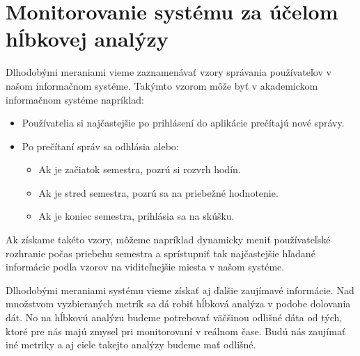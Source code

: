 \documentclass[a4paper, upjsfrontpage, disablespecwarning, thesismargins, thesislinespacing]{rnthesis}
\begin{document}

\section{Monitorovanie systému za účelom hĺbkovej analýzy}

Dlhodobými meraniami vieme zaznamenávať vzory správania používateľov v našom informačnom systéme.
Takýmto vzorom môže byť v akademickom informačnom systéme napríklad:

\begin{itemize}
	\item Používatelia si najčastejšie po prihlásení do aplikácie prečítajú nové správy.
	\item Po prečítaní správ sa odhlásia alebo:
	\begin{itemize}
		\item Ak je začiatok semestra, pozrú si rozvrh hodín.
		\item Ak je stred semestra, pozrú sa na priebežné hodnotenie.
		\item Ak je koniec semestra, prihlásia sa na skúšku.
	\end{itemize}
\end{itemize}

Ak získame takéto vzory, môžeme napríklad dynamicky meniť používateľské rozhranie počas priebehu semestra a sprístupniť tak najčastejšie hľadané informácie podľa vzorov na viditeľnejšie miesta v našom systéme.

Dlhodobými meraniami systému vieme získať aj ďalšie zaujímavé informácie.
Nad množstvom vyzbieraných metrík sa dá robiť hĺbková analýza v podobe dolovania dát.
No na hĺbkovú analýzu budeme potrebovať väčšinou odlišné dáta od tých, ktoré pre nás majú zmysel pri monitorovaní v reálnom čase.
Budú nás zaujímať iné metriky a aj ciele takejto analýzy budeme mať odlišné.

\newpage


\end{document}
